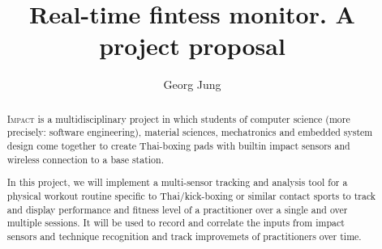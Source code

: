 \documentclass[a4paper]{article}
\author{Georg Jung}
\title{Real-time fintess monitor. A project proposal}
\begin{document}
\maketitle

\begin{abstract}
  \textsc{Impact} is a multidisciplinary project in which students
  of computer science (more precisely: software engineering), material
  sciences, mechatronics and embedded system design come together to
  create Thai-boxing pads with builtin impact sensors and wireless
  connection to a base station.

  In this project, we will implement a multi-sensor tracking and
  analysis tool for a physical workout routine specific to
  Thai/kick-boxing or similar contact sports to track and display
  performance and fitness level of a practitioner over a single and
  over multiple sessions. It will be used to record and correlate the
  inputs from impact sensors and technique recognition and track
  improvemets of practitioners over time.
\end{abstract}
\end{document}
